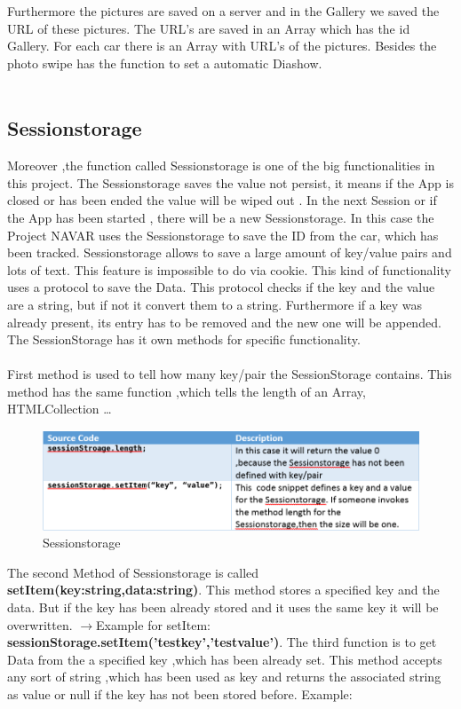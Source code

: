 Furthermore the pictures are saved on a server and in the Gallery we saved the URL of these pictures. The URL's are saved in an Array which has the id Gallery. For each car there is an Array with URL's of the pictures. Besides the photo swipe has the function to set a automatic Diashow.\\\\

\subsection{Sessionstorage}
Moreover ,the function called Sessionstorage is one of the big functionalities in this project. The Sessionstorage saves the value not persist, it means if the App is closed or has been ended  the value will be wiped out . In the next Session or if the App has been started , there will be a new Sessionstorage. In this case the Project NAVAR uses the Sessionstorage to save the ID from the car, which has been tracked. Sessionstorage allows  to save a large amount of  key/value pairs and lots of text. This feature is impossible to do  via cookie. This kind of functionality uses  a protocol to save the Data. This protocol checks if the key and the value are a string, but if not it convert them to a string. Furthermore if a key was already present, its entry  has to be removed and the new one will be appended. The SessionStorage has it own methods for specific functionality.\\\\

First method is used to tell how many key/pair the SessionStorage contains. This method has the same function ,which tells the length of an Array, HTMLCollection \dots

\begin{figure}[htbp]
\centering
\includegraphics[width=0.4\linewidth]{graphics/sessionstorage1.PNG}
\caption{Sessionstorage}
\end{figure}

The second Method of Sessionstorage is called \textbf{setItem(key:string,data:string)}. This method stores  a specified key  and the data. But if the key has been already stored and it uses the same key it will be overwritten. $\rightarrow$Example for setItem:\textbf{ sessionStorage.setItem('testkey','testvalue')}.
The third function is to get Data from the a specified key ,which has been already set. This method accepts any sort of string ,which has been used as key and returns the associated string as value or null if the key has not been stored before. Example:\\

